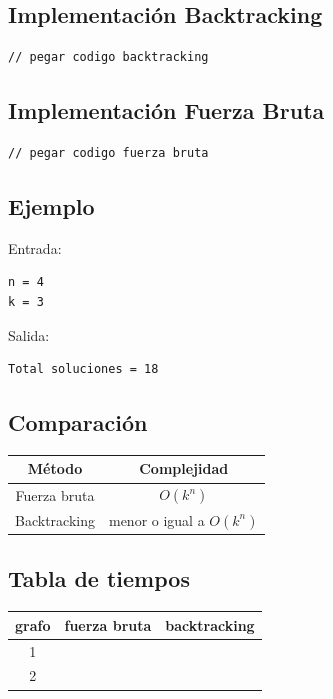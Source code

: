 \documentclass[12pt]{article}
\begin{document}
\subsection{Implementación Backtracking}

\begin{lstlisting}
// pegar codigo backtracking
\end{lstlisting}

\subsection{Implementación Fuerza Bruta}

\begin{lstlisting}
// pegar codigo fuerza bruta
\end{lstlisting}

\subsection{Ejemplo}

Entrada:

\begin{verbatim}
n = 4
k = 3
\end{verbatim}

Salida:

\begin{verbatim}
Total soluciones = 18
\end{verbatim}

\subsection{Comparación}

\begin{center}
\begin{tabular}{|c|c|}
\hline
Método & Complejidad \\
\hline
Fuerza bruta & $O(k^n)$ \\
Backtracking & menor o igual a $O(k^n)$ \\
\hline
\end{tabular}
\end{center}

\subsection{Tabla de tiempos}

\begin{center}
\begin{tabular}{|c|c|c|}
\hline
grafo & fuerza bruta & backtracking \\
\hline
1 & & \\
2 & & \\
\hline
\end{tabular}
\end{center}
\end{document}
